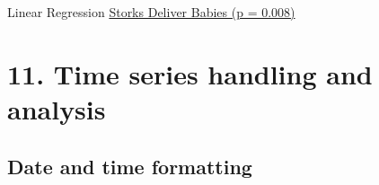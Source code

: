 \documentclass[xcolor=table,       handout,    xcolor=dvipsnames]{beamer}\usepackage[]{graphicx}\usepackage[]{color}
\begin{document}

\begin{frame}[fragile]{Linear Regression}
\href{http://www.econ.queensu.ca/files/other/storks.pdf}{Storks Deliver Babies (p = 0.008)}
\end{frame}

\section{11. Time series handling and analysis}

\subsection{Date and time formatting}
\end{document}
